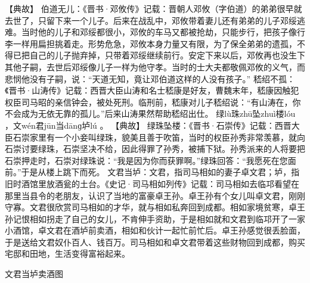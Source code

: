 \documentclass[12pt,UTF8]{ctexbook}
\begin{document}
【典故】
伯道无儿：《晋书·邓攸传》记载：晋朝人邓攸（字伯道）的弟弟很早就去世了，只留下来一个儿子。后来在战乱中，邓攸带着妻儿还有弟弟的儿子邓绥逃难。当时他的儿子和邓绥都很小，邓攸的车马又都被抢劫，只能步行，把孩子像行李一样用扁担挑着走。形势危急，邓攸本身力量又有限，为了保全弟弟的遗孤，不得已把自己的儿子抛弃掉，只带着邓绥继续前行。安定下来以后，邓攸再也没生下其他子嗣，去世后邓绥像儿子一样为他守孝。当时的士大夫都敬佩邓攸的义气，而悲悯他没有子嗣，说：“天道无知，竟让邓伯道这样的人没有孩子。”
嵇绍不孤：《晋书·山涛传》记载：西晋大臣山涛和名士嵇康是好友，曹魏末年，嵇康因触犯权臣司马昭的亲信钟会，被处死刑。临刑前，嵇康对儿子嵇绍说：“有山涛在，你不会成为无依无靠的孤儿。”后来山涛果然帮助嵇绍出仕。
绿lù珠zhū坠zhuì楼lóu
，文wén君jūn当dānɡ垆lú
。
【典故】
绿珠坠楼：《晋书·石崇传》记载：西晋大臣石崇家里有一个小妾叫绿珠，貌美且善于吹笛，当时的权臣孙秀非常羡慕，就向石崇讨要绿珠，石崇坚决不给，因此得罪了孙秀，被捕下狱。孙秀派来的人将要把石崇押走时，石崇对绿珠说：“我是因为你而获罪啊。”绿珠回答：“我愿死在您面前。”于是从楼上跳下而死。
文君当垆：文君，指司马相如的妻子卓文君；垆，指旧时酒馆里放酒瓮的土台。《史记·司马相如列传》记载：司马相如去临邛看望在那里当县令的老朋友，认识了当地的富豪卓王孙。卓王孙有个女儿叫卓文君，刚刚守寡。文君很欣赏司马相如的才华，就与相如私奔回到成都。相如家境贫寒，卓王孙记恨相如拐走了自己的女儿，不肯伸手资助，于是相如就和文君到临邛开了一家小酒馆，卓文君在酒垆前卖酒，相如和伙计一起忙前忙后。卓王孙感觉很丢脸面，于是送给文君奴仆百人、钱百万。司马相如和卓文君带着这些财物回到成都，购买宅邸和田地，生活变得富裕起来。

文君当垆卖酒图
\end{document}
